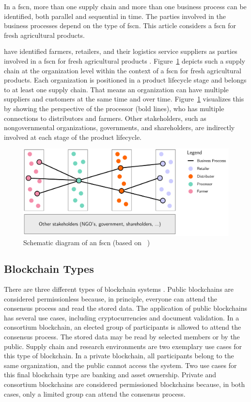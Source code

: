 \documentclass[conference,a4paper,flushend]{neutr}
\begin{document}
In a \ac{fscn}, more than one supply chain and more than one business process can be identified, both parallel and sequential in time. The parties involved in the business processes depend on the type of \ac{fscn}. This article considers a \ac{fscn} for fresh agricultural products.  

\citeauthor{van2005innovations} have identified farmers, retailers, and their logistics service suppliers as parties involved in a \ac{fscn} for fresh agricultural products \cite{van2005innovations}. Figure~\ref{fig:food_supply_network} depicts such a supply chain at the organization level within the context of a \ac{fscn} for fresh agricultural products. Each organization is positioned in a product lifecycle stage and belongs to at least one supply chain. That means an organization can have multiple suppliers and customers at the same time and over time. Figure~\ref{fig:food_supply_network} visualizes this by showing the perspective of the processor (bold lines), who has multiple connections to distributors and farmers. Other stakeholders, such as nongovernmental organizations, governments, and shareholders, are indirectly involved at each stage of the product lifecycle.

\begin{figure}[ht]
    \centering
    \includegraphics[page=1,scale=0.23]{fig-fscn}
	\caption{Schematic diagram of an \ac{fscn} (based on \citeauthor{van2005innovations}~\cite{van2005innovations})}
	\label{fig:food_supply_network}
\end{figure}

\subsection{Blockchain Types} \label{s:blockchain_types}
There are three different types of blockchain systems \cite{zheng2017overview}. Public blockchains are considered permissionless because, in principle, everyone can attend the consensus process and read the stored data. The application of public blockchains has several use cases, including cryptocurrencies and document validation. In a consortium blockchain, an elected group of participants is allowed to attend the consensus process. The stored data may be read by selected members or by the public. Supply chain and research environments are two exemplary use cases for this type of blockchain. In a private blockchain, all participants belong to the same organization, and the public cannot access the system. Two use cases for this final blockchain type are banking and asset ownership. Private and consortium blockchains are considered permissioned blockchains because, in both cases, only a limited group can attend the consensus process.
\end{document}
